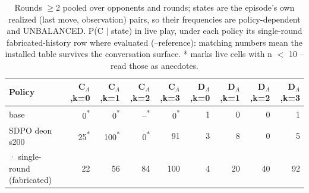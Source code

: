 \begin{table}[t]
\centering
\caption{Rounds $\geq$2 pooled over opponents and rounds; states are the episode's own realized (last move, observation) pairs, so their frequencies are policy-dependent and UNBALANCED. P(C $\mid$ state) in live play, under each policy its single-round fabricated-history row where evaluated (--reference): matching numbers mean the installed table survives the conversation surface. * marks live cells with n $<$ 10 -- read those as anecdotes.}
\label{tab:mr-live-states}
\small
\setlength{\tabcolsep}{3.5pt}
\begin{tabular}{lrrrrrrrr}
\toprule
Policy & C$_A$,k=0 & C$_A$,k=1 & C$_A$,k=2 & C$_A$,k=3 & D$_A$,k=0 & D$_A$,k=1 & D$_A$,k=2 & D$_A$,k=3 \\
\midrule
base & 0\textsuperscript{*} & 0\textsuperscript{*} & --\textsuperscript{*} & 0\textsuperscript{*} & 1 & 0 & 0 & 1 \\
SDPO deon s200 & 25\textsuperscript{*} & 100\textsuperscript{*} & 0\textsuperscript{*} & 91 & 3 & 8 & 0 & 5 \\
  · single-round (fabricated) & 22 & 56 & 84 & 100 & 4 & 20 & 40 & 92 \\
\bottomrule
\end{tabular}
\end{table}
